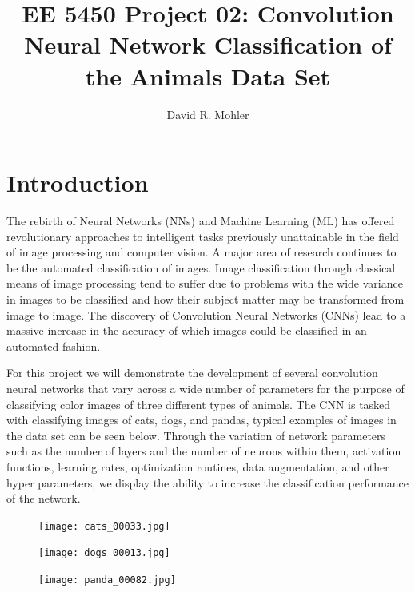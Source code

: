 \documentclass[12pt]{article}
\begin{document}
\title{EE 5450  Project 02: Convolution Neural Network Classification of the Animals Data Set}

\author{David R. Mohler}


\maketitle

\section{Introduction} 
The rebirth of Neural Networks (NNs) and Machine Learning (ML) has offered revolutionary approaches to intelligent tasks previously unattainable in the field of image processing and computer vision. A major area of research continues to be the automated classification of images. Image classification through classical means of image processing tend to suffer due to problems with the wide variance in images to be classified and how their subject matter may be transformed from image to image. The discovery of Convolution Neural Networks (CNNs) lead to a massive increase in the accuracy of which images could be classified in an automated fashion. 

For this project we will demonstrate the development of several convolution neural networks that vary across a wide number of parameters for the purpose of classifying color images of three different types of animals. The CNN is tasked with classifying images of cats, dogs, and pandas, typical examples of images in the data set can be seen below. Through the variation of network parameters such as the number of layers and the number of neurons within them, activation functions, learning rates, optimization routines, data augmentation, and other hyper parameters, we display the ability to increase the classification performance of the network. 
\begin{figure}[h]
	\centering %
	\captionsetup{justification=centering}
	\begin{minipage}{0.33\textwidth}
		\centering %
		\texttt{[image: cats\_00033.jpg]}
	\end{minipage}\hfill
	\begin{minipage}{0.33\textwidth}
		\centering %
		\texttt{[image: dogs\_00013.jpg]}
	\end{minipage}\hfill
	\begin{minipage}{0.33\textwidth}
		\centering %
		\texttt{[image: panda\_00082.jpg]}
	\end{minipage}\hfill
\end{figure}
\end{document}
